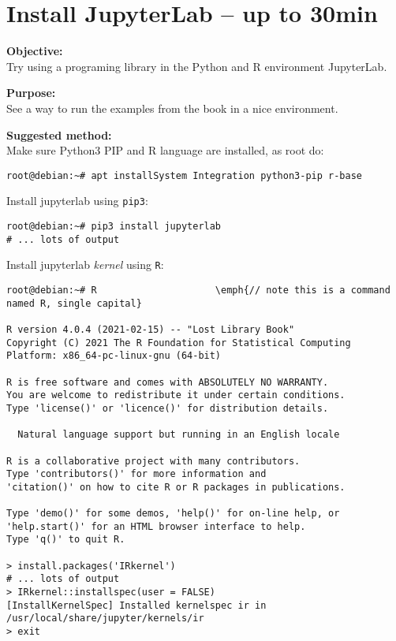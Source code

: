 \documentclass[a4paper,11pt,notitlepage]{report}
\begin{document}
\chapter{Install JupyterLab -- up to 30min}
\label{ex-python-Jupyterlab}


{\bf Objective:}\\
Try using a programing library in the Python and R environment JupyterLab.

{\bf Purpose:}\\
See a way to run the examples from the book in a nice environment.

{\bf Suggested method:}\\
Make sure Python3 PIP and R language are installed, as root do:
\begin{verbatim}
root@debian:~# apt installSystem Integration python3-pip r-base
\end{verbatim}

Install jupyterlab using \verb+pip3+:
\begin{verbatim}
root@debian:~# pip3 install jupyterlab
# ... lots of output
\end{verbatim}

\eject

Install jupyterlab \emph{kernel} using \verb+R+:
\begin{verbatim}
root@debian:~# R                     \emph{// note this is a command named R, single capital}

R version 4.0.4 (2021-02-15) -- "Lost Library Book"
Copyright (C) 2021 The R Foundation for Statistical Computing
Platform: x86_64-pc-linux-gnu (64-bit)

R is free software and comes with ABSOLUTELY NO WARRANTY.
You are welcome to redistribute it under certain conditions.
Type 'license()' or 'licence()' for distribution details.

  Natural language support but running in an English locale

R is a collaborative project with many contributors.
Type 'contributors()' for more information and
'citation()' on how to cite R or R packages in publications.

Type 'demo()' for some demos, 'help()' for on-line help, or
'help.start()' for an HTML browser interface to help.
Type 'q()' to quit R.

> install.packages('IRkernel')
# ... lots of output
> IRkernel::installspec(user = FALSE)
[InstallKernelSpec] Installed kernelspec ir in /usr/local/share/jupyter/kernels/ir
> exit
\end{verbatim}
\end{document}
